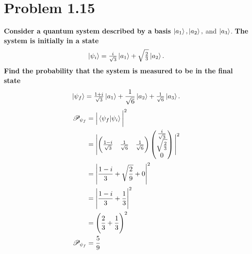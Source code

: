 \documentclass[paper=a4, fontsize=11pt]{scrartcl} %
\numberwithin{equation}{section} %
\numberwithin{figure}{section} %
\numberwithin{table}{section} %
\begin{document}
\section*{Problem 1.15}
\textbf{Consider a quantum system described by a basis} $\ket{a_1}, \ket{a_2},$ and $\ket{a_3}$. \textbf{The system is initially in a state}\\
\begin{equation*}
\ket{\psi_i} = \tfrac{i}{\sqrt{3}} \ket{a_1} + \sqrt{\tfrac{2}{3}} \ket{a_2}.
\end{equation*}
\textbf{Find the probability that the system is measured to be in the final state}
\begin{equation*}
\ket{\psi_f} = \tfrac{1+i}{\sqrt{3}} \ket{a_1} + \frac{1}{\sqrt{6}} \ket{a_2} +\tfrac{1}{\sqrt{6}} \ket{a_3}.
\end{equation*}
\begin{align*}
\mathscr{P}_{\psi_f} & = \Big |\braket{\psi_f|\psi_i} \bigg|^2 \\
& = \Bigg|\bigg(\tfrac{1-i}{\sqrt{3}}\quad \tfrac{1}{\sqrt{6}}\quad \tfrac{1}{\sqrt{6}} \bigg)  
\begin{pmatrix}
\tfrac{i}{\sqrt{3}} \\
\sqrt{\tfrac{2}{3}} \\
0
\end{pmatrix}
 \Bigg|^2 \\
 & =  \Bigg |  \frac{1-i}{3} + \sqrt{\frac{2}{9}} + 0  \Bigg |^2 \\
 & =  \Bigg |  \frac{1-i}{3} + \frac{1}{3}  \Bigg |^2 \\
 & = \Bigg (  \frac{2}{3} + \frac{1}{3}  \Bigg )^2 \\
 \mathscr{P}_{\psi_f} & = \frac{5}{9} 
\end{align*}
\end{document}
